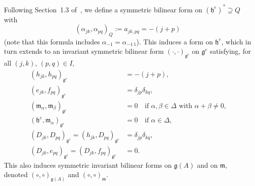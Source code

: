 \documentclass[11pt,letterpaper]{amsart}
\numberwithin{thecounter}{section}
\theoremstyle{definition}
\renewcommand{\a}{\alpha}
\renewcommand{\b}{\beta}
\begin{document}

Following Section~1.3 of~\cite{jurisich1996exposition}, 
we define a  symmetric bilinear form on $(\mathfrak{h}^e)^*\supseteq Q$ with
$$ \left(\a_{jk},\a_{pq} \right)_{Q}:=a_{jk,pq} = -(j+p) $$
(note that this formula includes $\a_{-1}=\a_{-1\,1}$).
This induces a form on $\mathfrak{h}^e$, which in turn extends to an
invariant symmetric bilinear form $\left(\cdot ,\cdot \right)_{\mathfrak{g}^e}$ on $\mathfrak{g}^e$ satisfying, for all $(j,k)$, $(p,q)\in {I}$, 
\begin{align*}
\tag{B:1}\label{B-gAe-hh}
\left(h_{jk},h_{pq} \right)_{\mathfrak{g}^e} &= - (j+p),\\
\tag{B:2}\label{B-gAe-ef}
  \left({e}_{jk},{f}_{pq} \right)_{\mathfrak{g}^e} &= \delta_{jp} \delta_{kq}, \\
\tag{B:3}\label{B-gAe-gg}
\left(\mathfrak{m}_{\a}, \mathfrak{m}_{\b} \right)_{\mathfrak{g}^e}&=0 \quad\text{if $\a,\b\in\Delta$ with $\a+\b\ne0$,}\\
\tag{B:4}\label{B-gAe-hg}
\left(\mathfrak{h}^e, \mathfrak{m}_{\a} \right)_{\mathfrak{g}^e}&=0 \quad\text{if $\a\in\Delta$,}\\
\tag{B:5}\label{B-gAe-dd-hd}
\left(D_{jk},D_{pq} \right)_{\mathfrak{g}^e} =   \left(h_{jk},D_{pq} \right)_{\mathfrak{g}^e} &= \delta_{jp} \delta_{kq},\\
\tag{B:6}\label{B-gAe-def}
  \left(D_{jk} ,e_{pq} \right)_{\mathfrak{g}^e}=\left(D_{jk}, f_{pq} \right)_{\mathfrak{g}^e}&=0.
\end{align*}  
This also induces symmetric invariant bilinear forms on $\mathfrak{g}(A)$ and on $\mathfrak{m}$, denoted $ \left(\circ,\circ \right)_{\mathfrak{g}(A)}$ and $ \left(\circ,\circ \right)_{\mathfrak{m}}$.
\end{document}
